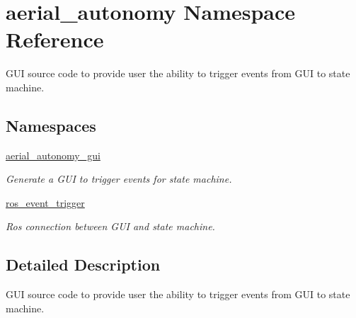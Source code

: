\hypertarget{namespaceaerial__autonomy}{\section{aerial\-\_\-autonomy Namespace Reference}
\label{namespaceaerial__autonomy}
}


G\-U\-I source code to provide user the ability to trigger events from G\-U\-I to state machine.  


\subsection*{Namespaces}
\begin{DoxyCompactItemize}
\item 
\hyperlink{namespaceaerial__autonomy_1_1aerial__autonomy__gui}{aerial\-\_\-autonomy\-\_\-gui}
\begin{DoxyCompactList}\small\item\em Generate a G\-U\-I to trigger events for state machine. \end{DoxyCompactList}\item 
\hyperlink{namespaceaerial__autonomy_1_1ros__event__trigger}{ros\-\_\-event\-\_\-trigger}
\begin{DoxyCompactList}\small\item\em Ros connection between G\-U\-I and state machine. \end{DoxyCompactList}\end{DoxyCompactItemize}


\subsection{Detailed Description}
G\-U\-I source code to provide user the ability to trigger events from G\-U\-I to state machine. 
